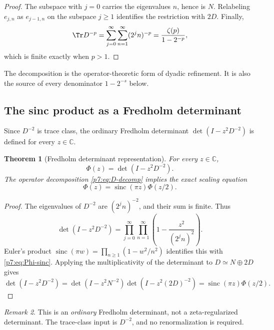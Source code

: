 \documentclass[11pt]{article}
\numberwithin{equation}{section}
\newtheorem{theorem}{Theorem}[section]
\theoremstyle{definition}
\theoremstyle{remark}
\newtheorem{remark}[theorem]{Remark}
\newcommand{\C}{\mathbb C}
\newcommand{\sinc}{\operatorname{sinc}}
\begin{document}
\begin{proof}
The subspace with $j=0$ carries the eigenvalues $n$, hence is $N$.  Relabeling $e_{j,n}$ as $e_{j-1,n}$ on the subspace $j\ge1$ identifies the restriction with $2D$.  Finally,
\[
 \Tr D^{-p}
 =\sum_{j=0}^{\infty}\sum_{n=1}^{\infty}(2^jn)^{-p}
 =\frac{\zeta(p)}{1-2^{-p}},
\]
which is finite exactly when $p>1$.
\end{proof}

The decomposition is the operator-theoretic form of dyadic refinement.  It is also the source of every denominator $1-2^{-s}$ below.

\subsection{The sinc product as a Fredholm determinant}

Since $D^{-2}$ is trace class, the ordinary Fredholm determinant $\det(I-z^2D^{-2})$ is defined for every $z\in\C$.

\begin{theorem}[Fredholm determinant representation]\label{p7:thm:fredholm}
For every $z\in\C$,
\begin{equation}\label{p7:eq:fredholm}
 \boxed{\ \Phi(z)=\det(I-z^2D^{-2}).\ }
\end{equation}
The operator decomposition \cref{p7:eq:D-decomp} implies the exact scaling equation
\begin{equation}\label{p7:eq:scaling-spectral}
 \Phi(z)=\sinc(\pi z)\Phi(z/2).
\end{equation}
\end{theorem}

\begin{proof}
The eigenvalues of $D^{-2}$ are $(2^jn)^{-2}$, and their sum is finite.  Thus
\[
 \det(I-z^2D^{-2})
 =\prod_{j=0}^{\infty}\prod_{n=1}^{\infty}
 \left(1-\frac{z^2}{(2^jn)^2}\right).
\]
Euler's product $\sinc(\pi w)=\prod_{n\ge1}(1-w^2/n^2)$ identifies this with \cref{p7:eq:Phi-sinc}.  Applying the multiplicativity of the determinant to $D\simeq N\oplus2D$ gives
\[
 \det(I-z^2D^{-2})
 =\det(I-z^2N^{-2})
  \det\!\left(I-z^2(2D)^{-2}\right)
 =\sinc(\pi z)\Phi(z/2).
\]
\end{proof}

\begin{remark}
This is an \emph{ordinary} Fredholm determinant, not a zeta-regularized determinant.  The trace-class input is $D^{-2}$, and no renormalization is required.
\end{remark}
\end{document}
